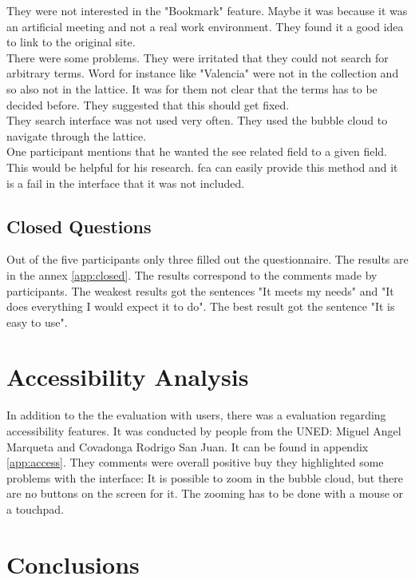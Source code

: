 \documentclass[11pt]{report}
\begin{document}
{{They were not interested in the "Bookmark" feature. Maybe it was because it was an artificial meeting and not a real work environment. They found it a good idea to link to the original site. \\

There were some problems. They were irritated that they could not search for arbitrary terms. Word for instance like "Valencia" were not in the collection and so also not in the lattice. It was for them not clear that the terms has to be decided before. They suggested that this should get fixed. \\

They search interface was not used very often. They used the bubble cloud to navigate through the lattice. \\

One participant mentions that he wanted the see related field to a given field. This would be helpful for his research. \acrshort{fca} can easily provide this method and it is a fail in the interface that it was not included.\\

\subsection{Closed Questions}

Out of the five participants only three filled out the questionnaire. The results are in the annex \ref{app:closed}. The results correspond to the comments made by participants. The weakest results got the sentences "It meets my needs" and "It does everything I would expect it to do". The best result got the sentence "It is easy to use".

\section{Accessibility Analysis}

In addition to the the evaluation with users, there was a evaluation regarding accessibility features. It was conducted by people from the UNED: Miguel Angel Marqueta and  Covadonga Rodrigo San Juan. It can be found in appendix \ref{app:access}. They comments were overall positive buy they highlighted some problems with the interface: It is possible to zoom in the bubble cloud, but there are no buttons on the screen for it. The zooming has to be done with a mouse or a touchpad.

\section{Conclusions}

}}
\end{document}

